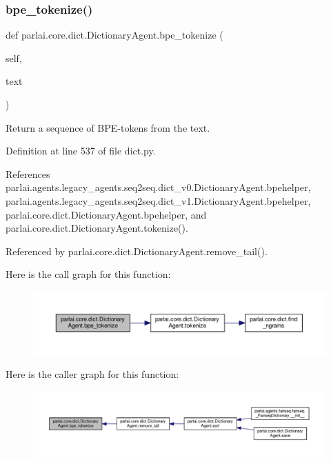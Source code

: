 \subsubsection{\texorpdfstring{bpe\+\_\+tokenize()}{bpe\_tokenize()}}
{\footnotesize\ttfamily def parlai.\+core.\+dict.\+Dictionary\+Agent.\+bpe\+\_\+tokenize (\begin{DoxyParamCaption}\item[{}]{self,  }\item[{}]{text }\end{DoxyParamCaption})}

\begin{DoxyVerb}Return a sequence of BPE-tokens from the text.\end{DoxyVerb}
 

Definition at line 537 of file dict.\+py.



References parlai.\+agents.\+legacy\+\_\+agents.\+seq2seq.\+dict\+\_\+v0.\+Dictionary\+Agent.\+bpehelper, parlai.\+agents.\+legacy\+\_\+agents.\+seq2seq.\+dict\+\_\+v1.\+Dictionary\+Agent.\+bpehelper, parlai.\+core.\+dict.\+Dictionary\+Agent.\+bpehelper, and parlai.\+core.\+dict.\+Dictionary\+Agent.\+tokenize().



Referenced by parlai.\+core.\+dict.\+Dictionary\+Agent.\+remove\+\_\+tail().

Here is the call graph for this function\+:
\nopagebreak
\begin{figure}[H]
\begin{center}
\leavevmode
\includegraphics[width=350pt]{classparlai_1_1core_1_1dict_1_1DictionaryAgent_a520e4bc630cd60f075ad21632ef677a1_cgraph}
\end{center}
\end{figure}
Here is the caller graph for this function\+:
\nopagebreak
\begin{figure}[H]
\begin{center}
\leavevmode
\includegraphics[width=350pt]{classparlai_1_1core_1_1dict_1_1DictionaryAgent_a520e4bc630cd60f075ad21632ef677a1_icgraph}
\end{center}
\end{figure}
\mbox{\label{classparlai_1_1core_1_1dict_1_1DictionaryAgent_a84faa359351d8b3edfb333e3b5f5ed71}} 
